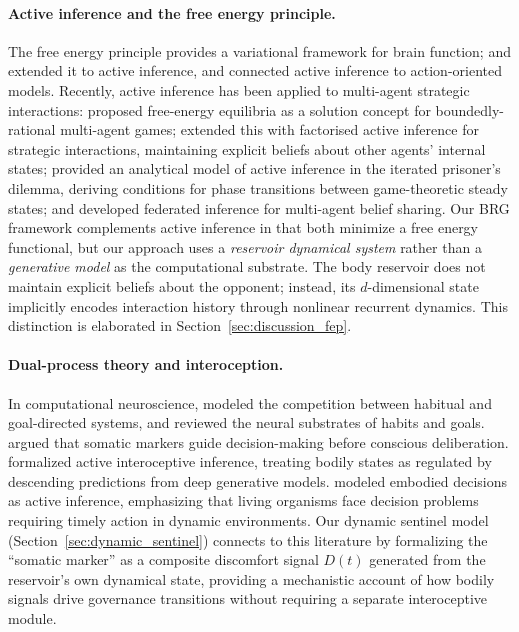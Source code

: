 \documentclass[11pt,a4paper]{article}
\theoremstyle{definition}
\begin{document}
\paragraph{Active inference and the free energy principle.}
The free energy principle \citep{friston2006, friston2010, friston2015}
provides a variational framework for brain function;
\citet{parr2022} and \citet{smith2022} extended it to active inference,
and \citet{tschantz2020} connected active inference to action-oriented models.
Recently, active inference has been applied to multi-agent strategic
interactions: \citet{hyland2024} proposed free-energy equilibria as a
solution concept for boundedly-rational multi-agent games;
\citet{ruizserra2025} extended this with factorised active inference for
strategic interactions, maintaining explicit beliefs about other agents'
internal states; \citet{demekas2024} provided an analytical model of
active inference in the iterated prisoner's dilemma, deriving conditions
for phase transitions between game-theoretic steady states;
and \citet{friston2024federated} developed federated inference for
multi-agent belief sharing.
Our BRG framework complements active inference in that both
minimize a free energy functional, but our approach uses a
\emph{reservoir dynamical system} rather than a \emph{generative model}
as the computational substrate.  The body reservoir does not maintain
explicit beliefs about the opponent; instead, its $d$-dimensional state
implicitly encodes interaction history through nonlinear recurrent dynamics.
This distinction is elaborated in Section~\ref{sec:discussion_fep}.

\paragraph{Dual-process theory and interoception.}
In computational neuroscience, \citet{daw2005} modeled the competition between
habitual and goal-directed systems, and \citet{dolan2013} reviewed the neural
substrates of habits and goals.  \citet{damasio1994} argued that somatic
markers guide decision-making before conscious deliberation.
\citet{seth2016} formalized active interoceptive inference, treating
bodily states as regulated by descending predictions from deep generative
models.  \citet{pezzulo2025} modeled embodied decisions as active inference,
emphasizing that living organisms face decision problems requiring timely
action in dynamic environments.
Our dynamic sentinel model (Section~\ref{sec:dynamic_sentinel})
connects to this literature by formalizing the ``somatic marker'' as a
composite discomfort signal $D(t)$ generated from the reservoir's own
dynamical state, providing a mechanistic account of how bodily signals
drive governance transitions without requiring a separate interoceptive
module.
\end{document}
